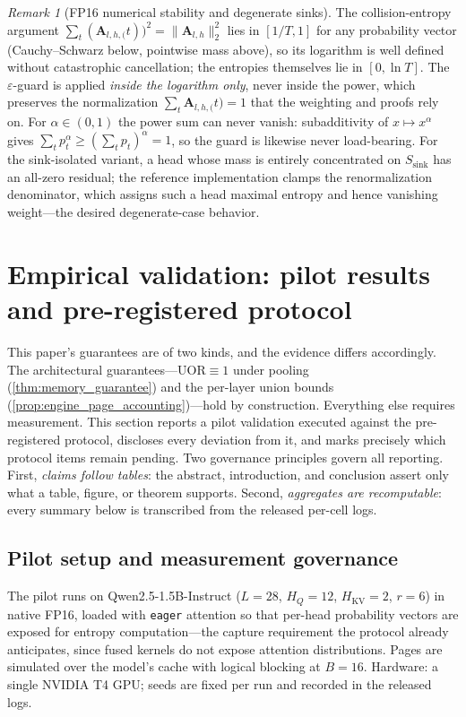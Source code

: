 \documentclass[final,5p,times,twocolumn]{elsarticle}
\theoremstyle{definition}
\theoremstyle{remark}
\newtheorem{remark}{Remark}
\newcommand{\HQ}{H_{Q}}
\newcommand{\HKV}{H_{\mathrm{KV}}}
\newcommand{\Attn}[2]{\mathbf{A}_{#1,#2}}
\newcommand{\UOR}{\mathrm{UOR}}
\newcommand{\Ssink}{S_{\mathrm{sink}}}
\begin{document}
\begin{remark}[FP16 numerical stability and degenerate sinks]
\label{rem:fp16}
The collision-entropy argument
 $\sum_t(\Attn{l,h}(t))^2=\|\Attn{l}{h}\|_2^2$ lies in $[1/T,1]$ for any
probability vector (Cauchy--Schwarz below, pointwise mass above), so
its logarithm is well defined without catastrophic cancellation; the
entropies themselves lie in $[0,\ln T]$. The $\varepsilon$-guard is
applied \emph{inside the logarithm only}, never inside the power, which
preserves the normalization $\sum_t\Attn{l,h}(t)=1$ that the weighting
and proofs rely on. For $\alpha\in(0,1)$ the power sum can never
vanish: subadditivity of $x\mapsto x^{\alpha}$ gives
 $\sum_t p_t^\alpha\ge(\sum_t p_t)^\alpha=1$, so the guard is likewise
never load-bearing. For the sink-isolated variant, a head whose mass is
entirely concentrated on $\Ssink$ has an all-zero residual; the
reference implementation clamps the renormalization denominator, which
assigns such a head maximal entropy and hence vanishing weight---the
desired degenerate-case behavior.
\end{remark}

\section{Empirical validation: pilot results and pre-registered
  protocol}
\label{sec:protocol}

This paper's guarantees are of two kinds, and the evidence differs
accordingly. The architectural guarantees---$\UOR\equiv 1$ under
pooling (\cref{thm:memory_guarantee}) and the per-layer union bounds
(\cref{prop:engine_page_accounting})---hold by construction. Everything
else requires measurement. This section reports a pilot validation
executed against the pre-registered protocol, discloses every deviation
from it, and marks precisely which protocol items remain pending. Two
governance principles govern all reporting. First, \emph{claims follow
tables}: the abstract, introduction, and conclusion assert only what a
table, figure, or theorem supports. Second, \emph{aggregates are
recomputable}: every summary below is transcribed from the released
per-cell logs.

\subsection{Pilot setup and measurement governance}
\label{subsec:pilot-setup}

The pilot runs on Qwen2.5-1.5B-Instruct ($L{=}28$, $\HQ{=}12$,
 $\HKV{=}2$, $r{=}6$) in native FP16, loaded with \texttt{eager}
attention so that per-head probability vectors are exposed for entropy
computation---the capture requirement the protocol already anticipates,
since fused kernels do not expose attention distributions. Pages are
simulated over the model's cache with logical blocking at $B{=}16$.
Hardware: a single NVIDIA T4 GPU; seeds are fixed per run and recorded
in the released logs.
\end{document}
